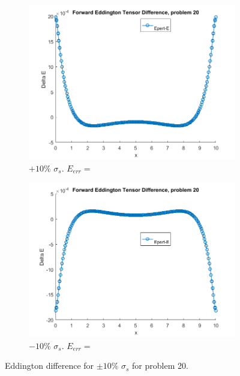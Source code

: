 \documentclass{article}
\begin{document}
\begin{figure}[H]
\centering
\begin{subfigure}{.5\textwidth}
  \centering
  \includegraphics[width=1\linewidth]{p20deltaEdss10.png}
  \caption{$+10\%$ $\sigma_s$. $E_{err}=$}
  \label{fig:sub1}
\end{subfigure}%
\begin{subfigure}{.5\textwidth}
  \centering
  \includegraphics[width=1\linewidth]{p20deltaEdss-10.png}
  \caption{$-10\%$ $\sigma_s$. $E_{err}=$}
  \label{fig:sub2}
\end{subfigure}
\caption{Eddington difference for $\pm10\%$ $\sigma_s$ for problem 20.}
\label{fig:test}
\end{figure}
\end{document}
